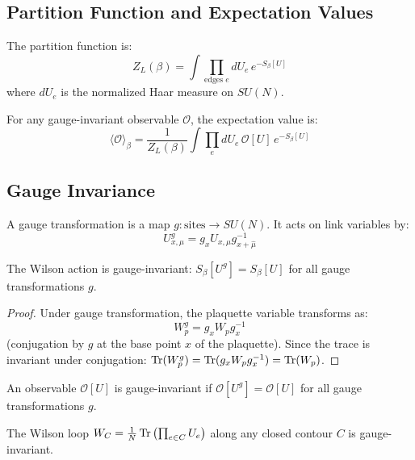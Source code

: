 \subsection{Partition Function and Expectation Values}

The partition function is:
\[
Z_L(\beta) = \int \prod_{\text{edges } e} dU_e \, e^{-S_\beta[U]}
\]
where $dU_e$ is the normalized Haar measure on $SU(N)$.

For any gauge-invariant observable $\mathcal{O}$, the expectation value is:
\[
\langle \mathcal{O} \rangle_\beta = \frac{1}{Z_L(\beta)} 
\int \prod_e dU_e \, \mathcal{O}[U] \, e^{-S_\beta[U]}
\]

\subsection{Gauge Invariance}

\begin{definition}
A gauge transformation is a map $g : \text{sites} \to SU(N)$. It acts on link 
variables by:
\[
U_{x,\mu}^g = g_x U_{x,\mu} g_{x+\hat{\mu}}^{-1}
\]
\end{definition}

\begin{lemma}
The Wilson action is gauge-invariant: $S_\beta[U^g] = S_\beta[U]$ for all 
gauge transformations $g$.
\end{lemma}

\begin{proof}
Under gauge transformation, the plaquette variable transforms as:
\[
W_p^g = g_x W_p g_x^{-1}
\]
(conjugation by $g$ at the base point $x$ of the plaquette). Since the trace 
is invariant under conjugation: $\operatorname{Tr}(W_p^g) = \operatorname{Tr}(g_x W_p g_x^{-1}) = \operatorname{Tr}(W_p)$.
\end{proof}

\begin{definition}
An observable $\mathcal{O}[U]$ is gauge-invariant if $\mathcal{O}[U^g] = \mathcal{O}[U]$ 
for all gauge transformations $g$.
\end{definition}

\begin{example}
The Wilson loop $W_C = \frac{1}{N}\operatorname{Tr}\left(\prod_{e \in C} U_e\right)$ along 
any closed contour $C$ is gauge-invariant.
\end{example}






